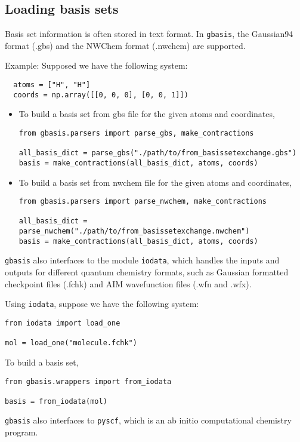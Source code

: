 \documentclass[letterpaper]{article}
\begin{document}
\subsection{Loading basis sets}
Basis set information is often stored in text format.
In \verb|gbasis|, the Gaussian94 format (.gbs) and the NWChem format (.nwchem) are
supported.

Example:
Supposed we have the following system:
\begin{lstlisting}
  atoms = ["H", "H"]
  coords = np.array([[0, 0, 0], [0, 0, 1]])
\end{lstlisting}
\begin{itemize}
\item To build a basis set from gbs file for the given atoms and coordinates,
  \begin{lstlisting}[xleftmargin=-25pt]
from gbasis.parsers import parse_gbs, make_contractions

all_basis_dict = parse_gbs("./path/to/from_basissetexchange.gbs")
basis = make_contractions(all_basis_dict, atoms, coords)
\end{lstlisting}
\item To build a basis set from nwchem file for the given atoms and coordinates,
  \begin{lstlisting}[xleftmargin=-25pt]
from gbasis.parsers import parse_nwchem, make_contractions

all_basis_dict = parse_nwchem("./path/to/from_basissetexchange.nwchem")
basis = make_contractions(all_basis_dict, atoms, coords)
\end{lstlisting}
\end{itemize}

\verb|gbasis| also interfaces to the module \verb|iodata|, which handles the
inputs and outputs for different quantum chemistry formats, such as Gaussian
formatted checkpoint files (.fchk) and AIM wavefunction files (.wfn and .wfx).

Using \verb|iodata|, suppose we have the following system:
\begin{lstlisting}
from iodata import load_one

mol = load_one("molecule.fchk")
\end{lstlisting}
To build a basis set,
\begin{lstlisting}
from gbasis.wrappers import from_iodata

basis = from_iodata(mol)
\end{lstlisting}


\verb|gbasis| also interfaces to \verb|pyscf|, which is an ab initio computational
chemistry program.
\end{document}

